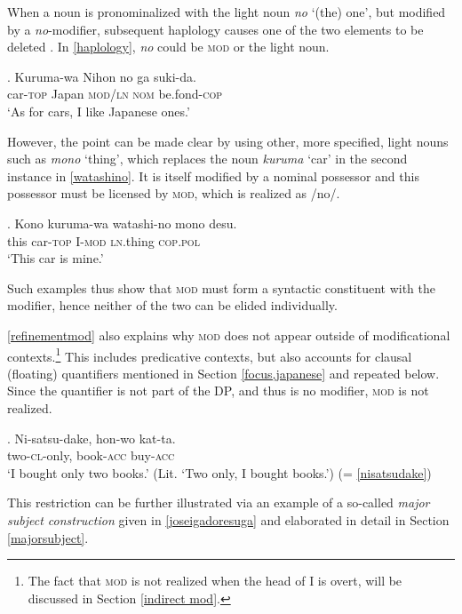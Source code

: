 When a noun is pronominalized with the light noun \textit{no} `(the) one’, but modified by a \textit{no}-modifier, subsequent haplology causes one of the two elements to be deleted \citep[13531–1352]{hiraiwa:2016:ellipsis}. In \ref{haplology}, \textit{no} could be \textsc{mod} or the light noun.

\exg. Kuruma-wa Nihon no ga suki-da.\\
car-\textsc{top} Japan \textsc{mod}/\textsc{ln} \textsc{nom} be.fond-\textsc{cop}\\
`As for cars, I like Japanese ones.’ \label{haplology}

However, the point can be made clear by using other, more specified, light nouns such as \textit{mono} `thing’, which replaces the noun \textit{kuruma} `car’ in the second instance in \ref{watashino}. It is itself modified by a nominal possessor and this possessor must be licensed by \textsc{mod}, which is realized as /no/.

\exg. Kono kuruma-wa watashi-no mono desu.\\
this car-\textsc{top} I-\textsc{mod} \textsc{ln}.thing \textsc{cop.pol}\\
`This car is mine.’ \label{watashino}

Such examples thus show that \textsc{mod} must form a syntactic constituent with the modifier, hence neither of the two can be elided individually.

\ref{refinementmod} also explains why \textsc{mod} does not appear outside of modificational contexts.\footnote{The fact that \textsc{mod} is not realized when the head of I is overt, will be discussed in Section \ref{indirect mod}.} This includes predicative contexts, but also accounts for clausal (floating) quantifiers mentioned in Section \ref{focus,japanese} and repeated below. Since the quantifier is not part of the DP, and thus is no modifier, \textsc{mod} is not realized.

\exg. Ni-satsu-dake, hon-wo kat-ta.\\
two-\textsc{cl}-only, book-\textsc{acc} buy-\textsc{acc}\\
`I bought only two books.’ (Lit. `Two only, I bought books.’) \null \hfill (= \ref{nisatsudake})

This restriction can be further illustrated via an example of a so-called \textit{major subject construction} \citep{kuroda:1992:japanese, heycock:1993:focus, vermeulen:2005:poss} given in \ref{joseigadoresuga} and elaborated in detail in Section \ref{majorsubject}.


